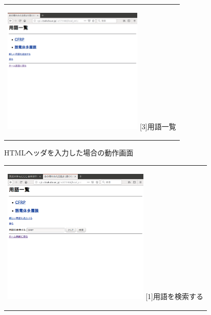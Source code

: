 \documentclass[12pt,a4paper]{jarticle}
\begin{document}
\begin{ttfamily}
\begin{figure}[htbp]
\begin{center}
\begin{tabular}{c}
      \begin{minipage}{0.5\hsize}
        \begin{center}
          \includegraphics[width=6.7cm]{10-3-40.eps}
          \hspace{1.6cm} [3]用語一覧
        \end{center}
      \end{minipage}

    \end{tabular}
    \caption{HTMLヘッダを入力した場合の動作画面}
    \label{fig:b}
  \end{center}
\end{figure}

\begin{figure}[htbp]
  \begin{center}
    \begin{tabular}{c}

      \begin{minipage}{0.55\hsize}
        \begin{center}
          \includegraphics[width=7.0cm]{10-3-41.eps}
          \hspace{1.6cm} [1]用語を検索する
        \end{center}
      \end{minipage}


\end{tabular}
\end{center}
\end{figure}
\end{ttfamily}
\end{document}
